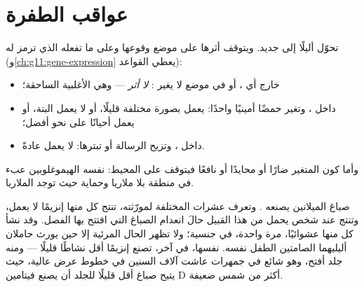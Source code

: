 \section{عواقب الطفرة}

\begin{proposition}\label{prop:g11:mutations:consequences}
 تحوّل أليلًا إلى  جديد. ويتوقف أثرها على موضع وقوعها وعلى
ما تفعله  الذي ترمز له 
(و\cref{ch:g11:gene-expression} يعطي القواعد):
\begin{itemize}
  \item خارج أي ، أو في موضع لا يغير : \emph{لا أثر}
        --- وهي الأغلبية الساحقة؛
  \item داخل ، وتغير حمضًا أمينيًا واحدًا:  يعمل بصورة
        مختلفة قليلًا، أو لا يعمل البتة، أو يعمل أحيانًا على نحو
        أفضل؛
  \item داخل ، وتزيح الرسالة أو تبترها:  لا يعمل عادةً.
\end{itemize}
وأما كون  المتغير ضارًا أو محايدًا أو نافعًا فيتوقف على
المحيط:  نفسه  الهيموغلوبين عبء في منطقة بلا ملاريا
وحماية حيث توجد الملاريا.
\end{proposition}
\admitted

\begin{example}\label{ex:g11:mutations:pigment}
صباغ الميلانين يصنعه . وتعرف عشرات  المختلفة لمورّثته،
تنتج كل منها إنزيمًا لا يعمل، وتنتج عند شخص يحمل  من هذا القبيل
حالَ انعدام الصباغ التي افتتح بها الفصل. وقد نشأ كل منها عشوائيًا،
مرة واحدة، في  جنسية؛ ولا تظهر الحال المرئية إلا حين يورث حاملان
أليليهما الصامتين الطفل نفسه.  نفسها، في  آخر، تصنع
إنزيمًا أقل نشاطًا قليلًا --- ومنه جلد أفتح، وهو شائع في جمهرات عاشت
آلاف السنين في خطوط عرض عالية، حيث يتيح صباغ أقل قليلًا للجلد أن يصنع
فيتامين D أكثر من شمس ضعيفة.
\end{example}


